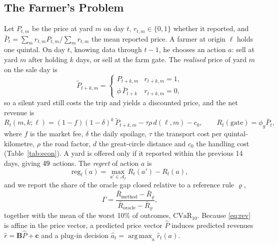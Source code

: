 \documentclass{ieeeaccess}
\DeclareMathOperator*{\argmax}{arg\,max}
\begin{document}
\subsection{The Farmer's Problem}
Let $P_{t,m}$ be the price at yard $m$ on day $t$, $r_{t,m}\in\{0,1\}$ whether it reported, and $\bar P_t=\sum_m r_{t,m}P_{t,m}/\sum_m r_{t,m}$ the mean reported price. A farmer at origin $\ell$ holds one quintal. On day $t$, knowing data through $t-1$, he chooses an action $a$: sell at yard $m$ after holding $k$ days, or sell at the farm gate. The \emph{realised} price of yard $m$ on the sale day is
\begin{equation}
\tilde P_{t+k,m}=\begin{cases}P_{t+k,m} & r_{t+k,m}=1,\\ \phi\,\bar P_{t+k} & r_{t+k,m}=0,\end{cases}
\end{equation}
so a silent yard still costs the trip and yields a discounted price, and the net revenue is
\begin{equation}
R_t(m,k;\ell)=(1-f)(1-\delta)^k\,\tilde P_{t+k,m}-\tau\rho\,d(\ell,m)-c_0,\qquad R_t(\mathrm{gate})=\phi_g\bar P_t,
\label{eq:rev}
\end{equation}
where $f$ is the market fee, $\delta$ the daily spoilage, $\tau$ the transport cost per quintal-kilometre, $\rho$ the road factor, $d$ the great-circle distance and $c_0$ the handling cost (Table~\ref{tab:econ}). A yard is offered only if it reported within the previous 14 days, giving $49{}$ actions. The \emph{regret} of action $a$ is
\begin{equation}
\mathrm{reg}_t(a)=\max_{a'\in\mathcal A_t}R_t(a')-R_t(a),
\end{equation}
and we report the share of the oracle gap closed relative to a reference rule $\varrho$,
\begin{equation}
\Gamma=\frac{\bar R_{\text{method}}-\bar R_{\varrho}}{\bar R_{\text{oracle}}-\bar R_{\varrho}},
\end{equation}
together with the mean of the worst 10\% of outcomes, $\mathrm{CVaR}_{10}$. Because \eqref{eq:rev} is affine in the price vector, a predicted price vector $\hat P$ induces predicted revenues $\hat r=\mathbf{B}\hat P+\mathbf c$ and a plug-in decision $\hat a_t=\argmax_a\hat r_t(a)$.

\begin{table}[!t]
\caption{Economic Parameters of the Net-Revenue Function (Scenario Assumptions)}
\label{tab:econ}
\centering
\setlength{\tabcolsep}{3pt}
\resizebox{\columnwidth}{!}{}
\end{table}
\end{document}
